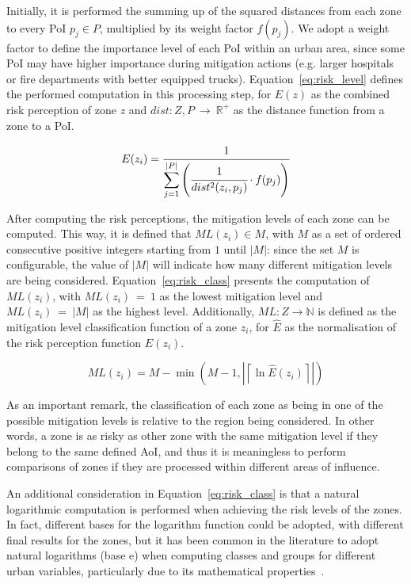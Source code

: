 \begin{refsection}
Initially, it is performed the summing up of the squared distances from each zone to every PoI $p_j \in P$, multiplied by its weight factor $f(p_j)$. We adopt a weight factor to define the importance level of each PoI within an urban area, since some PoI may have higher importance during mitigation actions (e.g. larger hospitals or fire departments with better equipped trucks). Equation~\ref{eq:risk_level} defines the performed computation in this processing step, for $E(z)$ as the combined risk perception of zone $z$ and $dist:Z,P~\to~\mathbb{R^+}$ as the distance function from a zone to a PoI.

\begin{equation}
  \label{eq:risk_level}
  E(z_i) = \cfrac{1}{\displaystyle\sum_{j = 1}^{\lvert P \rvert}\left(\cfrac{1}{dist^2(z_i, p_j)} \cdot f(p_j)\right)} 
\end{equation}

After computing the risk perceptions, the mitigation levels of each zone can be computed. This way, it is defined that $ML(z_i) \in M$, with $M$ as a set of ordered consecutive positive integers starting from $1$ until $|M|$: since the set $M$ is configurable, the value of $|M|$ will indicate how many different mitigation levels are being considered. Equation~\ref{eq:risk_class} presents the computation of $ML(z_i)$, with $ML(z_i)~=~1$ as the lowest mitigation level and $ML(z_i)~=~|M|$ as the highest level. Additionally, $ML:Z \to \mathbb{N}$ is defined as the mitigation level classification function of a zone $z_i$, for $\widehat{E}$ as the normalisation of the risk perception function $E(z_i)$. 

\begin{equation}
  \label{eq:risk_class}
  ML(z_i) = M - \min\left(M - 1, \left| \left\lceil \ln{\widehat{E}(z_i)} \right\rceil \right| \right)
\end{equation}

As an important remark, the classification of each zone as being in one of the possible mitigation levels is relative to the region being considered. In other words, a zone is as risky as other zone with the same mitigation level if they belong to the same defined AoI, and thus it is meaningless to perform comparisons of zones if they are processed within different areas of influence. 

An additional consideration in Equation~\ref{eq:risk_class} is that a natural logarithmic computation is performed when achieving the risk levels of the zones. In fact, different bases for the logarithm function could be adopted, with different final results for the zones, but it has been common in the literature to adopt natural logarithms (base $\mathrm{e}$) when computing classes and groups for different urban variables, particularly due to its mathematical properties~\cite{log3,log4,log1,log2}.


\end{refsection}
